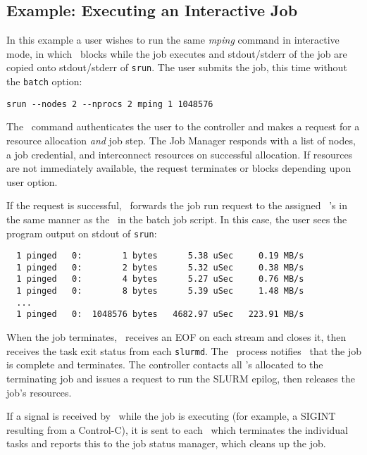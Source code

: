 \subsection{Example:  Executing an Interactive Job}

In this example a user wishes to run the same {\em mping} command 
in interactive mode, in which \srun\ blocks while the job executes 
and stdout/stderr of the job are copied onto stdout/stderr of {\tt srun}.
The user submits the job, this time without the {\tt batch} option:
\begin{verbatim}
srun --nodes 2 --nprocs 2 mping 1 1048576
\end{verbatim}

The \srun\ command authenticates the user to the controller and
makes a request for a resource allocation {\em and} job step. The Job Manager
responds with a list of nodes, a job credential, and interconnect
resources on successful allocation. If resources are not immediately
available, the request terminates or blocks depending upon user
option.

If the request is successful, \srun\ forwards the job run request
to the assigned \slurmd~'s in the same manner as the \srun\ in the
batch job script. In this case, the user sees the program output on 
stdout of {\tt srun}:

\begin{verbatim}
  1 pinged   0:        1 bytes      5.38 uSec     0.19 MB/s                     
  1 pinged   0:        2 bytes      5.32 uSec     0.38 MB/s                     
  1 pinged   0:        4 bytes      5.27 uSec     0.76 MB/s                     
  1 pinged   0:        8 bytes      5.39 uSec     1.48 MB/s                     
  ...
  1 pinged   0:  1048576 bytes   4682.97 uSec   223.91 MB/s              
\end{verbatim}

When the job terminates, \srun\ receives an EOF on each stream and
closes it, then receives the task exit status from each {\tt slurmd}.
The \srun\ process notifies \slurmctld\ that the job is complete 
and terminates. The controller contacts all \slurmd 's allocated to the
terminating job and issues a request to run the SLURM epilog, then releases
the job's resources.

If a signal is received by \srun\ while the job is executing (for example,
a SIGINT resulting from a Control-C), it is sent to each \slurmd\ which 
terminates the individual tasks and reports this to the job status manager,
which cleans up the job.

